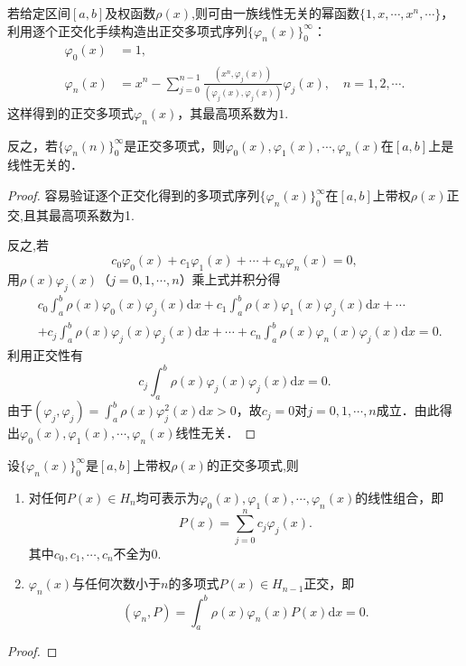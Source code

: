 \documentclass[../../main.tex]{subfiles}
\begin{document}
\begin{theorem}
若给定区间$[a,b]$及权函数$\rho(x)$,则可由一族线性无关的幂函数$\{1,x,\cdots,x^n,\cdots\}$，利用逐个正交化手续构造出正交多项式序列$\{\varphi_n(x)\}_{0}^{\infty}$：
\begin{align}
\varphi_0(x) &= 1, \nonumber \\
\varphi_n(x) &= x^n - \sum_{j=0}^{n-1} \frac{(x^n, \varphi_j(x))}{(\varphi_j(x), \varphi_j(x))} \varphi_j(x),\quad n=1,2,\cdots.\label{eq:数值分析-3-2.3}
\end{align}
这样得到的正交多项式$\varphi_n(x)$，其最高项系数为$1$.

反之，若$\{\varphi_n(n)\}_{0}^{\infty}$是正交多项式，则$\varphi_0(x),\varphi_1(x),\cdots,\varphi_n(x)$在$[a,b]$上是线性无关的．
\end{theorem}
\begin{proof}
容易验证逐个正交化得到的多项式序列$\{\varphi_n(x)\}_{0}^{\infty}$在$[a,b]$上带权$\rho(x)$正交,且其最高项系数为1.

反之,若
$$c_0\varphi_0(x) + c_1\varphi_1(x) + \cdots + c_n\varphi_n(x) = 0,$$
用$\rho(x)\varphi_j(x)$（$j=0,1,\cdots,n$）乘上式并积分得
\begin{align*}
&c_0\int_a^b{\rho (x)\varphi _0(x)\varphi _j(x)\mathrm{d}x}+c_1\int_a^b{\rho (x)\varphi _1(x)\varphi _j(x)\mathrm{d}x}+\cdots 
\\
&+c_j\int_a^b{\rho (x)\varphi _j(x)\varphi _j(x)\mathrm{d}x}+\cdots +c_n\int_a^b{\rho (x)\varphi _n(x)\varphi _j(x)\mathrm{d}x}=0.
\end{align*}
利用正交性有
$$c_j\int_a^b \rho(x)\varphi_j(x)\varphi_j(x)\mathrm{d}x = 0.$$
由于$(\varphi_j,\varphi_j) = \int_a^b \rho(x)\varphi_j^2(x)\mathrm{d}x > 0$，故$c_j = 0$对$j=0,1,\cdots,n$成立．由此得出$\varphi_0(x),\varphi_1(x),\cdots,\varphi_n(x)$线性无关．
\end{proof}

\begin{theorem}\label{theorem:正交多项式的性质}
设$\{\varphi_n(x)\}_{0}^{\infty}$是$[a,b]$上带权$\rho(x)$的正交多项式,则
\begin{enumerate}
\item 对任何$P(x) \in H_n$均可表示为$\varphi_0(x),\varphi_1(x),\cdots,\varphi_n(x)$的线性组合，即
$$P(x) = \sum_{j=0}^n c_j\varphi_j(x).$$
其中$c_0,c_1,\cdots,c_n$不全为0.

\item $\varphi_n(x)$与任何次数小于$n$的多项式$P(x) \in H_{n-1}$正交，即
$$(\varphi_n, P) = \int_a^b \rho(x)\varphi_n(x)P(x)\mathrm{d}x = 0.$$
\end{enumerate}
\end{theorem}
\begin{proof}

\end{proof}
\end{document}
